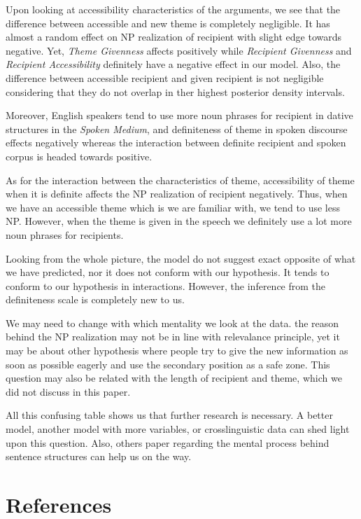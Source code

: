 \documentclass[english,floatsintext,man]{apa6}
\theoremstyle{definition}
\theoremstyle{definition}
\theoremstyle{definition}
\theoremstyle{remark}
\begin{document}
Upon looking at accessibility characteristics of the arguments, we see
that the difference between accessible and new theme is completely
negligible. It has almost a random effect on NP realization of recipient
with slight edge towards negative. Yet, \emph{Theme Givenness} affects
positively while \emph{Recipient Givenness} and \emph{Recipient
Accessibility} definitely have a negative effect in our model. Also, the
difference between accessible recipient and given recipient is not
negligible considering that they do not overlap in ther highest
posterior density intervals.

Moreover, English speakers tend to use more noun phrases for recipient
in dative structures in the \emph{Spoken Medium}, and definiteness of
theme in spoken discourse effects negatively whereas the interaction
between definite recipient and spoken corpus is headed towards positive.

As for the interaction between the characteristics of theme,
accessibility of theme when it is definite affects the NP realization of
recipient negatively. Thus, when we have an accessible theme which is we
are familiar with, we tend to use less NP. However, when the theme is
given in the speech we definitely use a lot more noun phrases for
recipients.

Looking from the whole picture, the model do not suggest exact opposite
of what we have predicted, nor it does not conform with our hypothesis.
It tends to conform to our hypothesis in interactions. However, the
inference from the definiteness scale is completely new to us.

We may need to change with which mentality we look at the data. the
reason behind the NP realization may not be in line with relevalance
principle, yet it may be about other hypothesis where people try to give
the new information as soon as possible eagerly and use the secondary
position as a safe zone. This question may also be related with the
length of recipient and theme, which we did not discuss in this paper.

All this confusing table shows us that further research is necessary. A
better model, another model with more variables, or crosslinguistic data
can shed light upon this question. Also, others paper regarding the
mental process behind sentence structures can help us on the way.

\pagebreak

\section{References}\label{references}
\end{document}
